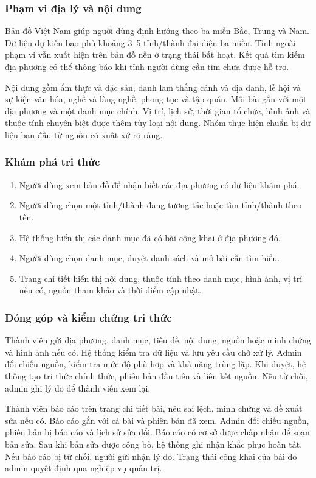 \subsubsection{Phạm vi địa lý và nội dung}
Bản đồ Việt Nam giúp người dùng định hướng theo ba miền Bắc, Trung và Nam. Dữ liệu dự
kiến bao phủ khoảng 3--5 tỉnh/thành đại diện ba miền. Tỉnh ngoài phạm vi vẫn xuất hiện
trên bản đồ nền ở trạng thái bất hoạt. Kết quả tìm kiếm địa phương có thể thông báo
khi tỉnh người dùng cần tìm chưa được hỗ trợ.

Nội dung gồm ẩm thực và đặc sản, danh lam thắng cảnh và địa danh, lễ hội và sự kiện văn hóa,
nghề và làng nghề, phong tục và tập quán. Mỗi bài gắn với một địa phương và một danh mục
chính. Vị trí, lịch sử, thời gian tổ chức, hình ảnh và thuộc tính chuyên biệt được thêm
tùy loại nội dung. Nhóm thực hiện chuẩn bị dữ liệu ban đầu từ nguồn có xuất xứ rõ ràng.

\subsubsection{Khám phá tri thức}
\begin{enumerate}
  \item Người dùng xem bản đồ để nhận biết các địa phương có dữ liệu khám phá.
  \item Người dùng chọn một tỉnh/thành đang tương tác hoặc tìm tỉnh/thành theo tên.
  \item Hệ thống hiển thị các danh mục đã có bài công khai ở địa phương đó.
  \item Người dùng chọn danh mục, duyệt danh sách và mở bài cần tìm hiểu.
  \item Trang chi tiết hiển thị nội dung, thuộc tính theo danh mục, hình ảnh, vị trí nếu có,
        nguồn tham khảo và thời điểm cập nhật.
\end{enumerate}
\subsubsection{Đóng góp và kiểm chứng tri thức}
Thành viên gửi địa phương, danh mục, tiêu đề, nội dung, nguồn hoặc minh chứng và hình ảnh
nếu có. Hệ thống kiểm tra dữ liệu và lưu yêu cầu chờ xử lý. Admin đối chiếu nguồn, kiểm tra
mức độ phù hợp và khả năng trùng lặp. Khi duyệt, hệ thống tạo tri thức chính thức, phiên bản
đầu tiên và liên kết nguồn. Nếu từ chối, admin ghi lý do để thành viên xem lại.

Thành viên báo cáo trên trang chi tiết bài, nêu sai lệch, minh chứng và đề xuất sửa nếu có.
Báo cáo gắn với cả bài và phiên bản đã xem. Admin đối chiếu nguồn, phiên bản bị báo cáo và
lịch sử sửa đổi. Báo cáo có cơ sở được chấp nhận để soạn bản sửa. Sau khi bản sửa được công
bố, hệ thống ghi nhận khắc phục hoàn tất. Nếu báo cáo bị từ chối, người gửi nhận lý do.
Trạng thái công khai của bài do admin quyết định qua nghiệp vụ quản trị.

